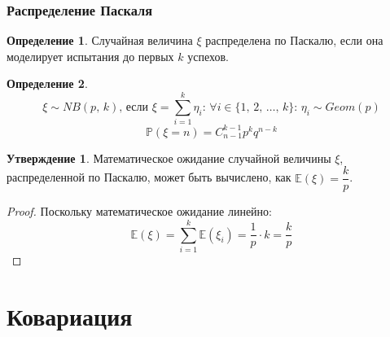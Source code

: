 \documentclass[12pt]{article}
\theoremstyle{definition}
\newtheorem{definition}{Определение}
\newtheorem{statement}[theorem]{Утверждение}
\newcommand{\E}{\mathbb{E}}
\newcommand{\prob}{\mathbb{P}}
\begin{document}
\subsubsection{Распределение Паскаля}

\begin{definition}
    Случайная величина $\xi$ распределена по Паскалю, если она моделирует испытания до первых $k$ успехов.
\end{definition}

\begin{definition}
    $$\xi \sim NB(p,\,k)\text{, если }\xi=\sum_{i=1}^k\eta_i:\,\forall i \in \{1,\,2,\,\ldots,\,k\}:\,\eta_i\sim Geom(p)$$
    $$\prob(\xi=n)=C_{n-1}^{k-1}p^kq^{n-k}$$
\end{definition}

\begin{statement}
    Математическое ожидание случайной величины $\xi$, распределенной по Паскалю, может быть вычислено, как $\E(\xi)=\dfrac{k}{p}$.
\end{statement}
\begin{proof}
    Поскольку математическое ожидание линейно: 
    $$\E(\xi)=\sum_{i=1}^{k}\E(\xi_i)=\frac{1}{p}\cdot k =\frac{k}{p}$$
\end{proof}

\section{Ковариация}
\end{document}
